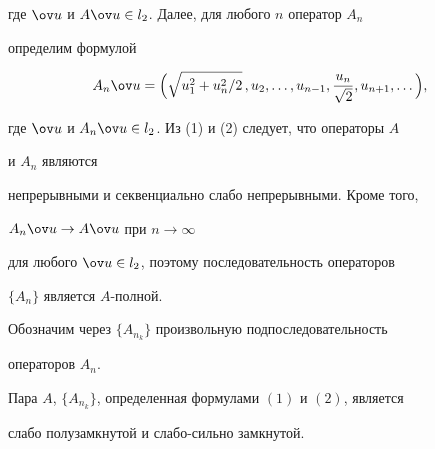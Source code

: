 где $\ov u$ и $A\ov u\in l_2$. Далее, для любого $n$ оператор $A_n$ 


определим формулой 


\begin{equation} 


A_n\ov u=\Big(\sqrt{u^2_1+u^2_n/2}\,,u_2,\dotsc,u_{n-1}, 


\frac{u_n}{\sqrt{2}},u_{n+1},\dotsc\Big), 


\end{equation} 


где $\ov u$ и $A_n\ov u\in l_2$. Из (1) и (2) следует, что операторы $A$ 


и $A_n$ являются 


непрерывными и секвенциально слабо непрерывными. Кроме того, 


$A_n\ov u\to A\ov u$ при $n\to\infty$ 


для любого $\ov u\in l_2$, поэтому последовательность операторов 


$\{A_n\}$ является $A$-полной. 


 


Обозначим через $\{A_{n_k}\}$ произвольную подпоследовательность 


операторов $A_n$. 


 


\begin{thm} 


Пара $A$, $\{A_{n_k}\}$, определенная формулами $(1)$ и $(2)$, является 


слабо полузамкнутой и слабо-сильно замкнутой. 


\end{thm} 


 


